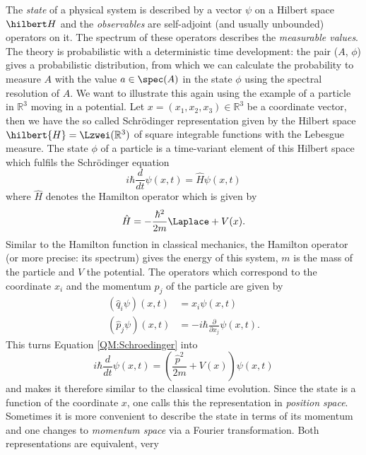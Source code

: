 The \emph{state} of a physical system is described by a vector $\psi$ on a 
Hilbert space $\hilbert H$ and the \emph{observables} are self-adjoint (and 
usually unbounded) operators on it. The spectrum of these operators describes 
the \emph{measurable values}. The theory is probabilistic with a deterministic 
time development: the pair ($A$, $\phi$) gives a probabilistic distribution, 
from which we can calculate the probability to measure $A$ with the value $a 
\in \spec (A)$ in the state $\phi$ using the spectral resolution of $A$. We 
want to illustrate this again using the example of a particle in $\mathbb{R}^3$ 
moving in a potential. Let $x = (x_1, x_2, x_3) \in \mathbb{R}^3$ be a 
coordinate vector, then we have the so called Schr\"odinger representation 
given by the Hilbert space $\hilbert{H} = \Lzwei(\mathbb{R}^3)$ of square 
integrable functions with the Lebesgue measure. The state $\phi$ of a particle 
is a time-variant element of this Hilbert space which fulfils the 
Schr\"odinger equation
\begin{equation}
	\label{QM:Schroedinger}
	i \hbar \frac{d}{dt} \psi(x, t)
	=
	\hat{H}
	\psi(x, t)
\end{equation}
where $\hat{H}$ denotes the Hamilton operator which is given by
\begin{equation}
	\hat{H}
	=
	- \frac{\hbar^2}{2 m}
	\Laplace + V(x).
\end{equation}
Similar to the Hamilton function in classical mechanics, the Hamilton operator 
(or more precise: its spectrum) gives the energy of this system, $m$ is the 
mass of the particle and $V$ the potential. The operators which correspond to 
the coordinate $x_i$ and the momentum $p_j$ of the particle are given by
\begin{align*}
	\left( \hat{q}_i
	\psi \right) (x, t)
	&=
	x_i
	\psi(x, t)
	\\
	\left( \hat{p}_j
	\psi \right) (x, t)
	&=
	- i \hbar 
	\frac{\partial}{\partial x_j}
	\psi(x, t).
\end{align*}
This turns Equation \eqref{QM:Schroedinger} into
\begin{equation*}
	i \hbar \frac{d}{dt} \psi(x, t)
	=
	\left( \frac{\hat{p}^2}{2m} + V(x) \right)
	\psi(x, t)
\end{equation*}
and makes it therefore similar to the classical time evolution.
Since the  state is a function of the coordinate $x$, one calls this the 
representation in \emph{position space}. Sometimes it is more convenient to 
describe the state in terms of its momentum and one changes to \emph{momentum 
space} via a Fourier transformation. Both representations are equivalent, very 

